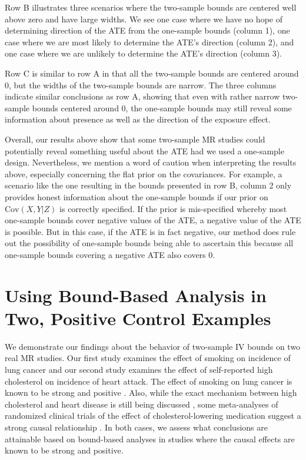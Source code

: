 \documentclass[
]{article}
\theoremstyle{plain}
\begin{document}
Row B illustrates three scenarios where the two-sample bounds are centered well above zero and have large widths. We see one case where we have no hope of determining direction of the ATE from the one-sample bounds (column 1), one case where we are most likely to determine the ATE's direction (column 2), and one case where we are unlikely to determine the ATE's direction (column 3).

Row C is similar to row A in that all the two-sample bounds are centered around 0, but the widths of the two-sample bounds are narrow. The three columns indicate similar conclusions as row A, showing that even with rather narrow two-sample bounds centered around 0, the one-sample bounds may still reveal some information about presence as well as the direction of the exposure effect.

Overall, our results above show that some two-sample MR studies could potentially reveal something useful about the ATE had we used a one-sample design. Nevertheless, we mention a word of caution when interpreting the results above, especially concerning the flat prior on the covariances. For example, a scenario like the one resulting in the bounds presented in row B, column 2 only provides honest information about the one-sample bounds if our prior on \(\text{Cov}(X,Y|Z)\) is correctly specified. If the prior is mis-specified whereby most one-sample bounds cover negative values of the ATE, a negative value of the ATE is possible. But in this case, if the ATE is in fact negative, our method does rule out the possibility of one-sample bounds being able to ascertain this because all one-sample bounds covering a negative ATE also covers \(0\).

\hypertarget{using-bound-based-analysis-in-two-positive-control-examples}{%
\section{\texorpdfstring{Using Bound-Based Analysis in Two, Positive Control Examples \label{data-analysis}}{Using Bound-Based Analysis in Two, Positive Control Examples }}\label{using-bound-based-analysis-in-two-positive-control-examples}}

We demonstrate our findings about the behavior of two-sample IV bounds on two real MR studies. Our first study examines the effect of smoking on incidence of lung cancer and our second study examines the effect of self-reported high cholesterol on incidence of heart attack. The effect of smoking on lung cancer is known to be strong and positive \autocite{united1964smoking}. Also, while the exact mechanism between high cholesterol and heart disease is still being discussed \autocite{holmes_mendelian_2015,richardson_evaluating_2020}, some meta-analyses of randomized clinical trials of the effect of cholesterol-lowering medication suggest a strong causal relationship \autocite{20051267,cholesterol_treatment_trialists_ctt_collaborators_effects_2012}. In both cases, we assess what conclusions are attainable based on bound-based analyses in studies where the causal effects are known to be strong and positive.
\end{document}
